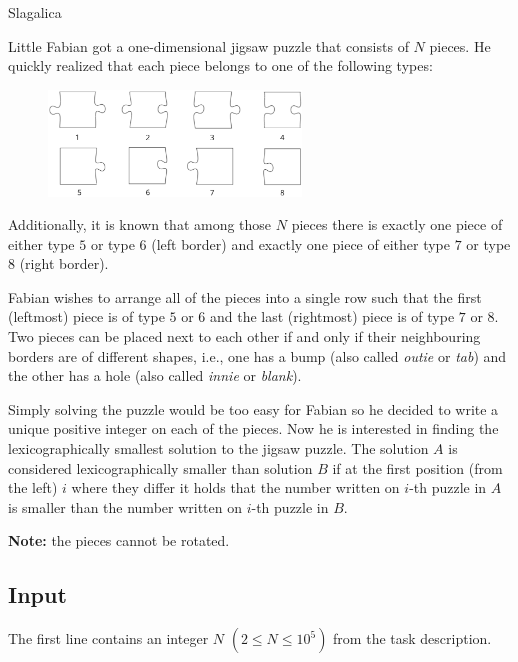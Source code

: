 \begin{statement}[
  problempoints=70,
  timelimit=1 second,
  memorylimit=512 MiB,
]{Slagalica}

Little Fabian got a one-dimensional jigsaw puzzle that consists of $N$ pieces.
He quickly realized that each piece belongs to one of the following types:\\

\begin{figure}[H]
\centering
\includegraphics[width=0.6\textwidth]{img/puzzledef.png}
\end{figure}

Additionally, it is known that among those $N$ pieces there is exactly one piece
of either type $5$ or type $6$ (left border) and exactly one piece of either type
$7$ or type $8$ (right border).

Fabian wishes to arrange all of the pieces into a single row such that
the first (leftmost) piece is of type $5$ or $6$ and the last (rightmost) piece
is of type $7$ or $8$. Two pieces can be placed next to each other if and only
if their neighbouring borders are of different shapes, i.e., one has a bump
(also called \textit{outie} or \textit{tab}) and the other has a hole (also
called \textit{innie} or \textit{blank}).

Simply solving the puzzle would be too easy for Fabian so he decided to write
a unique positive integer on each of the pieces. Now he is interested in finding
the lexicographically smallest solution to the jigsaw puzzle. The solution $A$
is considered lexicographically smaller than solution $B$ if at the first
position (from the left) $i$ where they differ it holds that the number written
on $i$-th puzzle in $A$ is smaller than the number written on $i$-th puzzle in
$B$.

\textbf{Note:} the pieces cannot be rotated.

\subsection*{Input}
The first line contains an integer $N$ $(2 \le N \le 10^5)$ from the task
description.


\end{statement}
